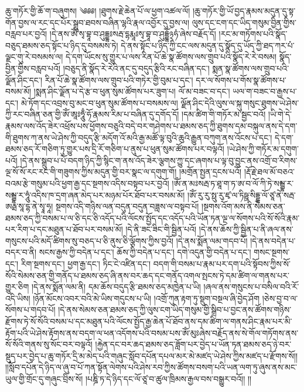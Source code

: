 ཆུ་གཏོར་གྱི་ཆོ་ག་བཞུགས། ༄༅༅། །ཐུགས་རྗེ་ཆེན་པོ་ལ་ཕྱག་འཚལ་ལོ། །ཆུ་གཏོར་གྱི་ཡོ་བྱད་རྣམས་མདུན་དུ་སྟ་གོན་བྱས་ལ་རང་དང་པོར་སྒྲུབ་ཐབས་བཞིན་ལྷའི་རྣལ་འབྱོར་དུ་བྱས་ལ། ལུས་དང་ངག་དང་ཡིད་གསུམ་བྱིན་གྱིས་བརླབ་པར་བྱའོ། །དེ་ནས་ཨོཾ་སྭ་བྷཱ་བ་ཤུདྡྷཿསརྦ་དྷརྨཱཿསྭ་བྷཱ་བ་ཤུདྡྷོ྅ཧཾ་ཞེས་བརྗོད་དོ། །རང་མ་གཏོགས་པའི་སྣོད་བཅུད་ཐམས་ཅད་སྟོང་པ་ཉིད་དུ་བསམས་ཏེ། དེ་ནས་སྟོང་པ་ཉིད་ཀྱི་ངང་ལས་མདུན་དུ་སྣོད་དུ་ཡོད་ཀྱི་ཐད་ཀར་པཾ་ལྗང་གུ་རེ་བསམས་ལ། དེ་དག་ཡོངས་སུ་གྱུར་པ་ལས་རིན་པོ་ཆེ་སྣ་ཚོགས་ལས་གྲུབ་པའི་སྣོད་རེ་རེ་བསམ། སྣོད་བྱིན་གྱིས་བརླབ་པའོ། །བཅུད་ནི་སྣོད་རེ་རེའི་ནང་དུ་བདུད་རྩིའི་རང་བཞིན་དང་། སྨན་སྣ་ཚོགས་ལས་གྲུབ་པའི་ལྗོན་ཤིང་དང་། རིན་པོ་ཆེ་སྣ་ཚོགས་ལས་གྲུབ་པའི་གཏེར་གྱི་བུམ་པ་དང་། དར་ལ་སོགས་པ་གོས་སྣ་ཚོགས་པ་བསམ་མོ། །སྨན་ཤིང་ལྗོན་པ་དེ་རྩ་བ་ཕུན་སུམ་ཚོགས་པར་ཟུག་པ། ལོ་མ་བཟང་བ་དང་། ཡལ་ག་བཟང་བ་རྒྱས་པ་དང་། མེ་ཏོག་དང་འབྲས་བུ་མང་བ་ཕུན་སུམ་ཚོགས་པ་བསམས་ལ། ལྗོན་ཤིང་དེའི་ལུས་ལ་སྐུ་གསུང་ཐུགས་ཡེ་ཤེས་ཀྱི་རང་བཞིན་ཅན་གྱི་ཨོཾ་ཨཱཿཧཱུྃ་ཧོ་རྣམས་རིམ་པ་བཞིན་དུ་དགོད་དོ། །དམ་ཚིག་གི་གཏོར་མ་སྦྱང་བའོ། །ཡི་གེ་དེ་རྣམས་ལས་འོད་ཟེར་འཕྲོས་པས་ཕྱོགས་བཅུའི་བདེ་བར་གཤེགས་པ་ཐམས་ཅད་ཀྱི་ཐུགས་དམ་བསྐུལ་ནས་དེ་དག་གི་ཐུགས་ཀ་ནས་ཡེ་ཤེས་ཀྱི་བདུད་རྩི་མདོག་འོ་མའི་རྒྱ་མཚོ་ལྟ་བུའི་ཆུའི་རྒྱུན་བཀུག་ནས་འོངས་པ་དང་། དེ་དག་ཐམས་ཅད་རོ་གཅིག་ཏུ་གྱུར་པས་དྲི་རོ་གཅིག་པ་ནུས་པ་ཕུན་སུམ་ཚོགས་པར་བལྟའོ། །ཡེ་ཤེས་ཀྱི་གཏོར་མ་དགུག་པའོ། །དེ་ནས་སྒྲུབ་པ་པོ་བདག་ཉིད་ཀྱི་སྙིང་ག་ནས་འོད་ཟེར་ལྕགས་ཀྱུ་དང་ཞགས་པ་ལྟ་བུ་བྱུང་ནས་འགྲོ་བ་རིགས་ལྔ་སོ་སོ་རང་རང་གི་གཟུགས་ཀྱིས་མདུན་གྱི་བར་སྣང་ལ་དགུག་གོ། །མགྲོན་སྤྱན་དྲངས་པའོ། །རྡོ་རྗེ་ཐལ་མོ་བཅའ་བའམ་རྩེ་གསུམ་པའི་ཕྱག་རྒྱ་དང་སྔགས་འདིས་བསྟབ་པར་བྱའོ། །ཨོཾ་ན་མཿསརྦ་ཏ་ཐཱ་ག་ཏ་ཨ་བ་ལོ་ཀི་ཏེ་སམྦྷ་ར་སམྦྷ་ར་ཧཱུཾ་འདིས་ཁ་དྲག་ཞན་མེད་པར་མཉམ་པོར་ཐོབ་པར་བསམ་མོ། །ཨོཾ་རུ་རུ་སྥུ་རུ་ཛྭ་ལ་ཏིཥྛ་སིདྡྷ་ལོ་ཙཱ་ནེ་སརྦ་ཨརྠ་སཱ་དྷ་ནེ་སྭཱ་ཧཱ། སྔགས་འདི་གཉིས་ལན་བདུན་བདུན་བཟླས་ལ་བསྟབ་པོ། །སྔགས་འོག་མས་ནི་སེམས་ཅན་ཐམས་ཅད་ཀྱི་བསམ་པ་ལ་ཅི་དང་ཅི་འདོད་པའི་ལོངས་སྤྱོད་དང་འདོད་པའི་ཡོན་ཏན་ལྔ་ལ་སོགས་པའི་སོ་སོའི་རྣམ་པར་རིག་པ་དང་མཐུན་པ་ཐོབ་པར་བསམ་མོ། །དེ་ནི་ཟང་ཟིང་གི་སྦྱིན་པའོ། །དེ་ནས་ཆོས་ཀྱི་སྦྱིན་པ་ནི་ཞལ་ནས་གསུངས་པའི་མདོ་ཚིགས་སུ་བཅད་པ་ཅི་ནུས་ཅི་ལྕོགས་ཀྱིས་བྱའོ། །དེ་ནས་སྨོན་ལམ་གདབ་པོ། །དེ་ནས་བདེན་པ་བདར་བ་ནི། སངས་རྒྱས་ཀྱི་བདེན་པ་དང་། ཆོས་ཀྱི་བདེན་པ་དང་། དགེ་འདུན་གྱི་བདེན་པ་དང་། གསང་སྔགས་དང་། རིག་སྔགས་དང་། ཕྱག་རྒྱ་དང་། ཏིང་ངེ་འཛིན་དང་། བདག་གི་བསམ་པ་རྣམ་པར་དག་པའི་སྟོབས་ཀྱིས་སོ་སོའི་སེམས་ཅན་གྱི་གནོད་པ་ཐམས་ཅད་ཞི་ནས་བར་ཆད་དང་གནོད་འགལ་སྤངས་ཏེ་དམ་ཚིག་ལ་གནས་པར་གྱུར་ཅིག །དེ་ནས་སྨོན་ལམ་ནི། དམ་ཆོས་བདུད་རྩི་ཐམས་ཅད་མཁྱེན་པ་ཡི། །ཞལ་ནས་གསུངས་པ་བསིལ་བའི་རོ་འདི་ཡིས། །ཉོན་མོངས་འབར་བའི་མེ་ཡིས་གདུངས་པ་ཡི། །འགྲོ་ཀུན་རྟག་ཏུ་སྡུག་བསྔལ་ཞི་བྱེད་ཤོག །ཅེས་བྱ་བ་ལ་སོགས་པ་གདབ་པོ། །དེ་ནས་སེམས་ཅན་ཐམས་ཅད་ཀྱི་ལུས་ངག་ཡིད་གསུམ་གྱི་སྒྲིབ་པ་བྱང་ནས་ཚོགས་གཉིས་རྫོགས་ཏེ་སོ་སོའི་བསམ་པ་དང་མཐུན་པའི་ལོངས་སྤྱོད་རྒྱ་ཆེན་པོ་ཐོབ་ནས་དམ་ཚིག་ལ་གནས་ཤིང་རྣམ་པར་མི་རྟོག་པའི་ཡེ་ཤེས་རྟོགས་ནས་བདག་ལ་ཕན་འདོགས་པའི་བསམ་པས་ཨོཾ་མུཿཞེས་བརྗོད་ནས་སེ་གོལ་གཏོགས་ནས་སོ་སོའི་གནས་སུ་སོང་བར་བལྟའོ། །རྐྱེན་དང་བར་ཆད་ཐམས་ཅད་ཟློག་པར་བྱེད་པ་ཡོན་ཏན་ཐམས་ཅད་ཉེ་བར་སྡུད་པར་བྱེད་པ་ཆུ་གཏོར་དྲི་མ་མེད་པའི་གཞུང་སློབ་དཔོན་དཔལ་མར་མེ་མཛད་ཡེ་ཤེས་ཀྱིས་མཛད་པ་རྫོགས་སོ།། །།སློབ་དཔོན་དེ་ཉིད་ལ་ཞུ་བ་པོ་ཀན་སྟོན་ལེགས་པའི་ཤེས་རབ་ཀྱིས་ཚོགས་བསག་པའི་ཡན་ལག་ཏུ་ཞུས་ནས་མང་ཡུལ་གྱི་གྲོང་དུ་གཞུང་བྲིས་སོ། །པཎྜི་ཏ་དེ་ཉིད་དང་ལོ་ཙཱ་བ་ཚུལ་ཁྲིམས་རྒྱལ་བས་བསྒྱུར་བའོ།། །།
